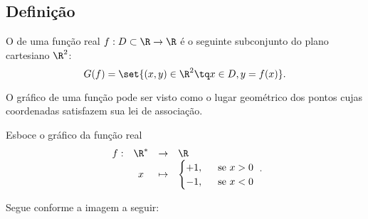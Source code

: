 \subsection{Definição}

\begin{definition}
    O  de uma função real $f : D \subset \R \to \R$ é o seguinte subconjunto do plano
cartesiano $\R^2$: $$G(f) = \set{(x,y) \in \R^2 \tq x \in D , y =
f(x)}.$$
\end{definition}

\begin{remark}
    O gráfico de uma função pode ser visto como o lugar geométrico
dos pontos cujas coordenadas satisfazem sua lei de associação.
\end{remark}

\begin{example}
    Esboce o gráfico da função real
    $$\begin{array}{cccl}
    f : & \R^\ast & \to     & \R \\
        &  x & \mapsto & \begin{cases}
                            +1,  &  \ \text{ se } x >0 \\
                            -1, &  \ \text{ se } x <0
                            \end{cases}
    \end{array}.$$
\end{example}

\begin{solution}
    Segue conforme a imagem a seguir:

    \begin{center}
        
    \end{center}
\end{solution}